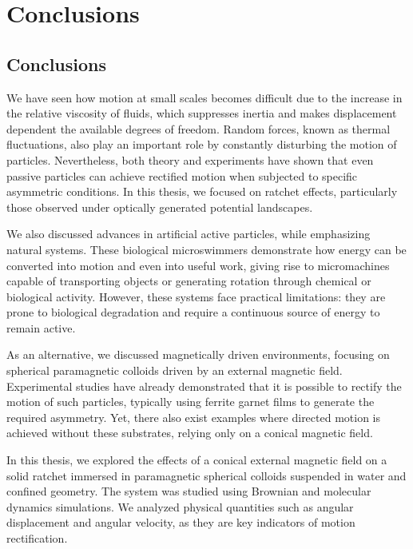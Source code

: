 \part{Conclusions}
\label{part:conclusions}

\chapter{Conclusions}

We have seen how motion at small scales becomes difficult due to the increase in the relative viscosity of fluids, which suppresses inertia and makes displacement dependent the available degrees of freedom. Random forces, known as thermal fluctuations, also play an important role by constantly disturbing the motion of particles. Nevertheless, both theory and experiments have shown that even passive particles can achieve rectified motion when subjected to specific asymmetric conditions. In this thesis, we focused on ratchet effects, particularly those observed under optically generated potential landscapes.

We also discussed advances in artificial active particles, while emphasizing natural systems. These biological microswimmers demonstrate how energy can be converted into motion and even into useful work, giving rise to micromachines capable of transporting objects or generating rotation through chemical or biological activity. However, these systems face practical limitations: they are prone to biological degradation and require a continuous source of energy to remain active.

As an alternative, we discussed magnetically driven environments, focusing on spherical paramagnetic colloids driven by an external magnetic field. Experimental studies have already demonstrated that it is possible to rectify the motion of such particles, typically using ferrite garnet films to generate the required asymmetry. Yet, there also exist examples where directed motion is achieved without these substrates, relying only on a conical magnetic field.

In this thesis, we explored the effects of a conical external magnetic field on a solid ratchet immersed in paramagnetic spherical colloids suspended in water and confined geometry. The system was studied using Brownian and molecular dynamics simulations. We analyzed physical quantities such as angular displacement and angular velocity, as they are key indicators of motion rectification.

